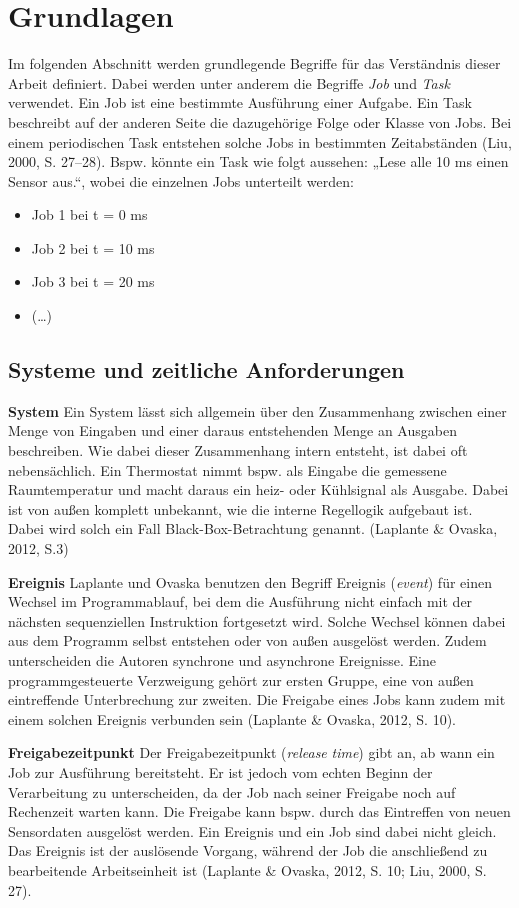 \chapter{Grundlagen}
Im folgenden Abschnitt werden grundlegende Begriffe für das Verständnis dieser Arbeit definiert. Dabei werden unter anderem die Begriffe \emph{Job} und \emph{Task} verwendet. Ein Job ist eine bestimmte Ausführung einer Aufgabe. Ein Task beschreibt auf der anderen Seite die dazugehörige Folge oder Klasse von Jobs. Bei einem periodischen Task entstehen solche Jobs in bestimmten Zeitabständen (Liu, 2000, S. 27–28). Bspw. könnte ein Task wie folgt aussehen: „Lese alle 10 ms einen Sensor aus.“, wobei die einzelnen Jobs unterteilt werden:

\begin{itemize}
\item Job 1 bei t = 0 ms
\item Job 2 bei t = 10 ms
\item Job 3 bei t = 20 ms
\item (…)
\end{itemize}
\section{Systeme und zeitliche Anforderungen}
\textbf{System} Ein System lässt sich allgemein über den Zusammenhang zwischen einer Menge von Eingaben und einer daraus entstehenden Menge an Ausgaben beschreiben. Wie dabei dieser Zusammenhang intern entsteht, ist dabei oft nebensächlich. Ein Thermostat nimmt bspw. als Eingabe die gemessene Raumtemperatur und macht daraus ein heiz- oder Kühlsignal als Ausgabe. Dabei ist von außen komplett unbekannt, wie die interne Regellogik aufgebaut ist. Dabei wird solch ein Fall Black-Box-Betrachtung genannt. (Laplante \& Ovaska, 2012, S.3)

\textbf{Ereignis }Laplante und Ovaska benutzen den Begriff Ereignis (\emph{event}) für einen Wechsel im Programmablauf, bei dem die Ausführung nicht einfach mit der nächsten sequenziellen Instruktion fortgesetzt wird. Solche Wechsel können dabei aus dem Programm selbst entstehen oder von außen ausgelöst werden. Zudem unterscheiden die Autoren synchrone und asynchrone Ereignisse. Eine programmgesteuerte Verzweigung gehört zur ersten Gruppe, eine von außen eintreffende Unterbrechung zur zweiten. Die Freigabe eines Jobs kann zudem mit einem solchen Ereignis verbunden sein (Laplante \& Ovaska, 2012, S. 10).

\textbf{Freigabezeitpunkt }Der Freigabezeitpunkt (\emph{release} \emph{time}) gibt an, ab wann ein Job zur Ausführung bereitsteht. Er ist jedoch vom echten Beginn der Verarbeitung zu unterscheiden, da der Job nach seiner Freigabe noch auf Rechenzeit warten kann. Die Freigabe kann bspw. durch das Eintreffen von neuen Sensordaten ausgelöst werden. Ein Ereignis und ein Job sind dabei nicht gleich. Das Ereignis ist der auslösende Vorgang, während der Job die anschließend zu bearbeitende Arbeitseinheit ist (Laplante \& Ovaska, 2012, S. 10; Liu, 2000, S. 27).

